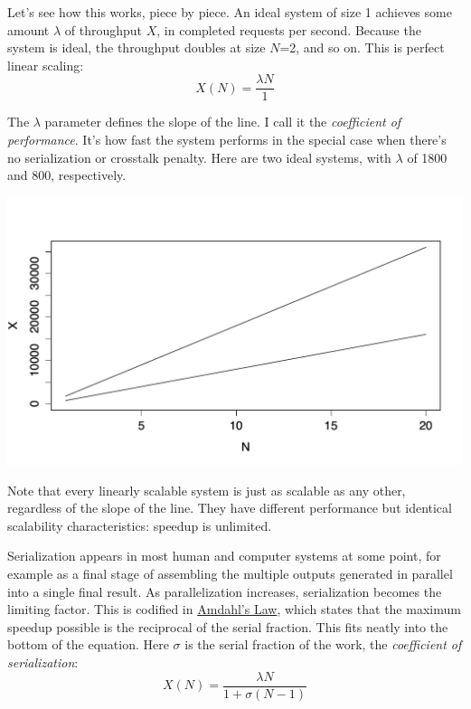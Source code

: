 \documentclass{vivid_layout}
\begin{document}
Let's see how this works, piece by piece. An ideal system of size 1
achieves some amount $\lambda$ of throughput $X$, in completed requests per
second. Because the system is ideal, the throughput doubles at size $N$=2, and so
on. This is perfect linear scaling:
\[
X(N) = \frac{\lambda N}{1}
\]

The $\lambda$ parameter defines the slope of the line. I call it the {\itshape
coefficient of performance}. It's how fast the system performs in the special
case when there's no serialization or crosstalk penalty.
Here are two ideal systems, with $\lambda$ of 1800 and 800, respectively.
\begin{center}
\includegraphics[width=.85\linewidth]{scalability/ideal-linear}
\end{center}

Note that every linearly scalable system is just as scalable as any other,
regardless of the slope of the line. They have different performance but
identical scalability characteristics: speedup is unlimited. 

Serialization appears in most human and computer systems at some point, for
example as a final stage of assembling the multiple outputs generated in
parallel into a single final result. As parallelization increases, serialization
becomes the limiting factor. This is codified in
\href{https://en.wikipedia.org/wiki/Amdahl\%27s\_law}{Amdahl's Law}, which states that
the maximum speedup possible is the reciprocal of the serial fraction. This fits
neatly into the bottom of the equation. Here $\sigma$ is the serial fraction of
the work, the {\itshape coefficient of serialization}:
\[
X(N) = \frac{\lambda N}{1 + \sigma(N-1)}
\]
\end{document}
